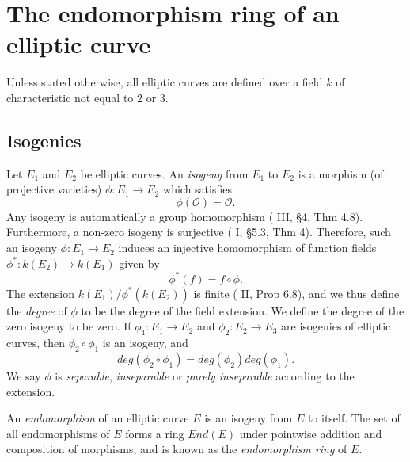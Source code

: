 \section{The endomorphism ring of an elliptic curve}
\label{sec:endomorphism-ring-of-an-elliptic-curve}

Unless stated otherwise, all elliptic curves are defined over a field $k$ of
characteristic not equal to $2$ or $3$.

\subsection{Isogenies}
\label{sec:isogenies}

Let $E_{1}$ and $E_{2}$ be elliptic curves.  An \emph{isogeny} from $E_{1}$ to
$E_{2}$ is a morphism (of projective varieties) $\phi \colon E_{1} \rightarrow E_{2}$
which satisfies
\begin{equation*}
  \phi \left( \mathcal{O} \right) = \mathcal{O}.
\end{equation*}
Any isogeny is automatically a group homomorphism (\cite{silverman86} III, \S 4, Thm
4.8).  Furthermore, a non-zero isogeny is surjective (\cite{shafarevich94} I, \S 5.3,
Thm 4).  Therefore, such an isogeny $\phi \colon E_{1} \rightarrow E_{2}$ induces an
injective homomorphism of function fields $\phi^{*} \colon \bar{k}\left(E_{2}\right)
\rightarrow \bar{k}\left(E_{1}\right)$ given by
\begin{equation*}
  \phi^{*}\left(f\right) = f \circ \phi.
\end{equation*}
The extension $\bar{k}\left(E_{1}\right) /
\phi^{*}\left(\bar{k}\left(E_{2}\right)\right)$ is finite (\cite{hartshorne77} II,
Prop 6.8), and we thus define the \emph{degree} of $\phi$ to be the degree of the
field extension.  We define the degree of the zero isogeny to be zero.  If $\phi_{1}
\colon E_{1} \rightarrow E_{2}$ and $\phi_{2} \colon E_{2} \rightarrow E_{3}$ are
isogenies of elliptic curves, then $\phi_{2} \circ \phi_{1}$ is an isogeny, and
\begin{equation}
  \label{eq:degree-of-composition}
  deg \left( \phi_{2} \circ \phi_{1} \right) = deg \left( \phi_{2} \right) deg \left( \phi_{1} \right).
\end{equation}
We say $\phi$ is \emph{separable}, \emph{inseparable} or \emph{purely inseparable}
according to the extension.

An \emph{endomorphism} of an elliptic curve $E$ is an isogeny from $E$ to itself.
The set of all endomorphisms of $E$ forms a ring $End(E)$ under pointwise addition
and composition of morphisms, and is known as the \emph{endomorphism ring} of $E$.

